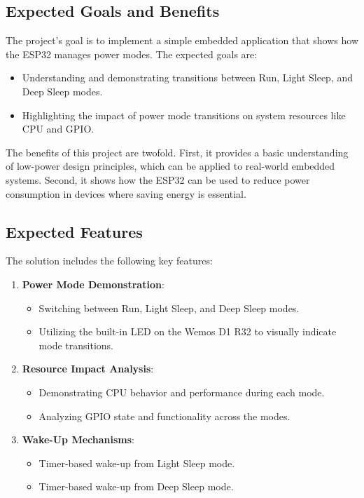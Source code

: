 \documentclass[a4paper, 11pt]{article}
\begin{document}
    \subsection{Expected Goals and Benefits}
    The project’s goal is to implement a simple embedded application that shows how the ESP32 manages power modes. The expected goals are:
    \begin{itemize}
    \item Understanding and demonstrating transitions between Run, Light Sleep, and Deep Sleep modes.
    \item Highlighting the impact of power mode transitions on system resources like CPU and GPIO.
    \end{itemize}
    
    The benefits of this project are twofold. First, it provides a basic understanding of low-power design principles, which can be applied to real-world embedded systems. Second, it shows how the ESP32 can be used to reduce power consumption in devices where saving energy is essential.
    
    \subsection{Expected Features}
    The solution includes the following key features:
    \begin{enumerate}
        \item \textbf{Power Mode Demonstration}:
        \begin{itemize}
            \item Switching between Run, Light Sleep, and Deep Sleep modes.
            \item Utilizing the built-in LED on the Wemos D1 R32 to visually indicate mode transitions.
        \end{itemize}
        \item \textbf{Resource Impact Analysis}:
        \begin{itemize}
            \item Demonstrating CPU behavior and performance during each mode.
            \item Analyzing GPIO state and functionality across the modes.
        \end{itemize}
        \item \textbf{Wake-Up Mechanisms}:
        \begin{itemize}
            \item Timer-based wake-up from Light Sleep mode.
            \item Timer-based wake-up from Deep Sleep mode.
        \end{itemize}
    \end{enumerate}
\end{document}
